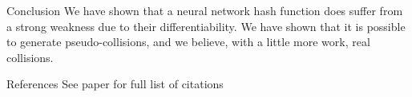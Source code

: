 \documentclass[final]{beamer}
\newlength{\onecolwid}
\begin{document}
\begin{frame}[t]
\begin{columns}[t]
\begin{column}{\onecolwid}
\begin{block}{Conclusion}
    We have shown that a neural network hash function does suffer from a strong
    weakness due to their differentiability. We have shown that it is possible
    to generate pseudo-collisions, and we believe, with a little more work,
    real collisions.
\end{block}






\begin{block}{References}
    \tiny{See paper for full list of citations}
\small{
\vspace{0.75in}}

\end{block}






\end{column}
\end{columns}
\end{frame}
\end{document}
